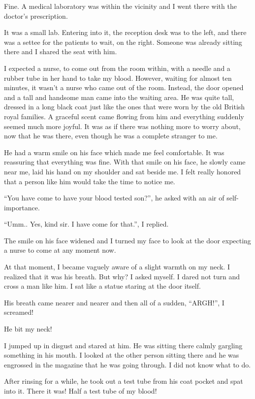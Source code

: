 \documentclass[twoside,11pt,titlepage]{article}
\begin{document}
Fine. A medical laboratory was within the vicinity and I went there with the doctor's prescription.

It was a small lab. Entering into it, the reception desk was to the left, and there was a settee for the patients to wait, on the right. Someone was already sitting there and I shared the seat with him.

I expected a nurse, to come out from the room within, with a needle and a rubber tube in her hand to take my blood. However, waiting for almost ten minutes, it wasn't a nurse who came out of the room. Instead, the door opened and a tall and handsome man came into the waiting area. He was quite tall, dressed in a long black coat just like the ones that were worn by the old British royal families. A graceful scent came flowing from him and everything suddenly seemed much more joyful. It was as if there was nothing more to worry about, now that he was there, even though he was a complete stranger to me.

He had a warm smile on his face which made me feel comfortable. It was reassuring that everything was fine. With that smile on his face, he slowly came near me, laid his hand on my shoulder and sat beside me. I felt really honored that a person like him would take the time to notice me.

``You have come to have your blood tested son?'', he asked with an air of self-importance.

``Umm.. Yes, kind sir. I have come for that.'', I replied.

The smile on his face widened and I turned my face to look at the door expecting a nurse to come at any moment now.

At that moment, I became vaguely aware of a slight warmth on my neck. I realized that it was his breath. But why? I asked myself. I dared not turn and cross a man like him. I sat like a statue staring at the door itself.

His breath came nearer and nearer and then all of a sudden, ``ARGH!'', I screamed!

He bit my neck!

I jumped up in disgust and stared at him. He was sitting there calmly gargling something in his mouth. I looked at the other person sitting there and he was engrossed in the magazine that he was going through. I did not know what to do.

After rinsing for a while, he took out a test tube from his coat pocket and spat into it. There it was! Half a test tube of my blood!
\end{document}
